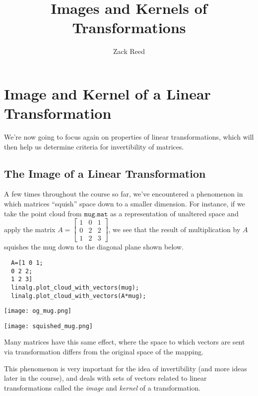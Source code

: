 \documentclass{ximera}
\author{Zack Reed}
\title{Images and Kernels of Transformations}
\begin{document}
\begin{abstract}

\end{abstract}
\maketitle


\section*{Image and Kernel of a Linear Transformation}

We're now going to focus again on properties of linear transformations, which will then help us determine criteria for invertibility of matrices.

\subsection*{The Image of a Linear Transformation}

A few times throughout the course so far, we've encountered a phenomenon in which matrices ``squish'' space down to a smaller dimension. For instance, if we take the point cloud from $\texttt{mug.mat}$ as a representation of unaltered space and apply the matrix $A=\begin{bmatrix}
  1&0&1\\0&2&2\\1&2&3
\end{bmatrix}$, we see that the result of multiplication by $A$ squishes the mug down to the diagonal plane shown below. 

\begin{verbatim}
  A=[1 0 1;
  0 2 2;
  1 2 3]
  linalg.plot_cloud_with_vectors(mug);
  linalg.plot_cloud_with_vectors(A*mug);
\end{verbatim}



\begin{center}
  \texttt{[image: og\_mug.png]}
\end{center}

\begin{center}
  \texttt{[image: squished\_mug.png]}
\end{center}

Many matrices have this same effect, where the space to which vectors are sent via transformation differs from the original space of the mapping. 

This phenomenon is very important for the idea of invertibility (and more ideas later in the course), and deals with sets of vectors related to linear transformations called the \emph{image} and \emph{kernel} of a transformation.
\end{document}

